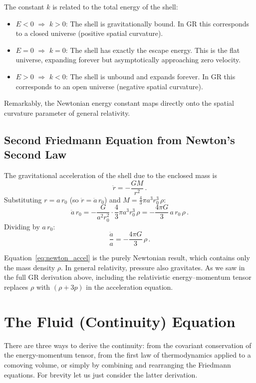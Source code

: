 The constant $k$ is related to the total energy of the shell:
\begin{itemize}
    \item $E<0$ $\Rightarrow$ $k>0$: The shell is gravitationally bound. In GR this corresponds to a closed universe (positive spatial curvature).
    \item $E=0$ $\Rightarrow$ $k=0$: The shell has exactly the escape energy. This is the flat universe, expanding forever but asymptotically approaching zero velocity.
    \item $E>0$ $\Rightarrow$ $k<0$: The shell is unbound and expands forever. In GR this corresponds to an open universe (negative spatial curvature).
\end{itemize}
Remarkably, the Newtonian energy constant maps directly onto the spatial curvature parameter of general relativity.

\subsection*{Second Friedmann Equation from Newton's Second Law}

The gravitational acceleration of the shell due to the enclosed mass is
\begin{equation}
    \ddot{r} = -\frac{GM}{r^2}\,.
\end{equation}
Substituting $r=a\,r_0$ (so $\ddot{r}=\ddot{a}\,r_0$) and $M=\frac{4}{3}\pi a^3 r_0^3\,\rho$:
\begin{equation}
    \ddot{a}\,r_0 = -\frac{G}{a^2 r_0^2}\cdot\frac{4}{3}\pi a^3 r_0^3\,\rho = -\frac{4\pi G}{3}\,a\,r_0\,\rho\,.
\end{equation}
Dividing by $a\,r_0$:
\begin{equation}\label{eq:newton_accel}
    \frac{\ddot{a}}{a} = -\frac{4\pi G}{3}\,\rho\,.
\end{equation}

Equation~\eqref{eq:newton_accel} is the purely Newtonian result, which contains only the mass density $\rho$. In general relativity, pressure also gravitates. As we saw in the full GR derivation above, including the relativistic energy--momentum tensor replaces $\rho$ with $(\rho+3p)$ in the acceleration equation.


\section{The Fluid (Continuity) Equation}
There are three ways to derive the continuity: from the covariant conservation of the energy-momentum tensor, from the first law of thermodynamics applied to a comoving volume, or simply by combining and rearranging the Friedmann equations. For brevity let us just consider the latter derivation.

